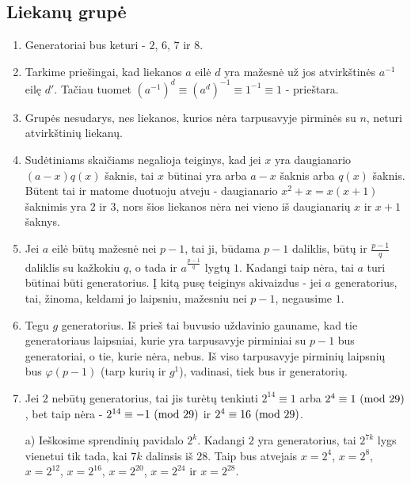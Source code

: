 \subsection*{Liekanų grupė} 
\begin{enumerate}
\item
    Generatoriai bus keturi - $2$, $6$, $7$ ir $8$.
\item
    Tarkime priešingai, kad liekanos $a$ eilė $d$ yra mažesnė už jos
    atvirkštinės $a^{-1}$ eilę $d'$. Tačiau tuomet $(a^{-1})^d \equiv
    (a^d)^{-1} \equiv 1^{-1} \equiv 1$ - prieštara.
\item
    Grupės nesudarys, nes liekanos, kurios nėra tarpusavyje pirminės su
    $n$, neturi atvirkštinių liekanų.
\item
    Sudėtiniams skaičiams negalioja teiginys, kad jei $x$ yra daugianario
    $(a-x)q(x)$ šaknis, tai $x$ būtinai yra arba $a-x$ šaknis arba
    $q(x)$ šaknis. Būtent tai ir matome duotuoju atveju - daugianario
    $x^2+x = x(x+1)$ šaknimis yra $2$ ir $3$, nors šios liekanos nėra nei
    vieno iš daugianarių $x$ ir $x+1$ šaknys. 
\item
    Jei $a$ eilė būtų mažesnė nei $p-1$, tai ji, būdama $p-1$ daliklis,
    būtų ir $\frac{p-1}{q}$ daliklis su kažkokiu $q$, o tada ir
    $a^{\frac{p-1}{q}}$ lygtų $1$. Kadangi taip nėra, tai $a$ turi būtinai
    būti generatorius. Į kitą pusę teiginys akivaizdus - jei $a$
    generatorius, tai, žinoma, keldami jo laipsniu, mažesniu nei
    $p-1$, negausime $1$. 
\item
    Tegu $g$ generatorius. Iš prieš tai buvusio uždavinio gauname, kad tie
    generatoriaus laipsniai, kurie yra tarpusavyje pirminiai su $p-1$ bus
    generatoriai, o tie, kurie nėra, nebus. Iš viso tarpusavyje pirminių
    laipsnių bus $\varphi(p-1)$ (tarp kurių ir $g^1$), vadinasi, tiek bus
    ir generatorių.
\item
    Jei $2$ nebūtų generatorius, tai jis turėtų tenkinti $2^{14}\equiv 1$
    arba $2^{4} \equiv 1 \ (\text{mod } 29)$, bet taip nėra - $2^{14}\equiv -1 \ (\text{mod } 29)$ ir
    $2^4 \equiv 16 \ (\text{mod } 29)$.
    
    a) Ieškosime sprendinių pavidalo $2^k$. Kadangi $2$ yra generatorius,
    tai $2^{7k}$ lygs vienetui tik tada, kai $7k$ dalinsis iš $28$. Taip
    bus atvejais $x=2^4$, $x=2^8$, $x=2^{12}$, $x=2^{16}$, $x=2^{20}$,
    $x=2^{24}$ ir $x=2^{28}$. 
    

\end{enumerate}

